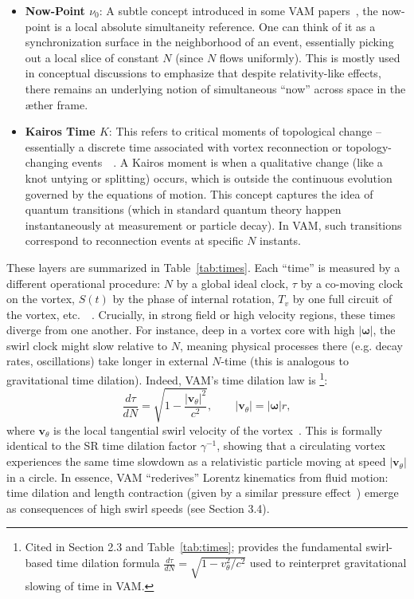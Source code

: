 \documentclass[a4paper,12pt]{article}
\begin{document}
\begin{itemize}
        \item \textbf{Now-Point $\nu_0$}: A subtle concept introduced in some VAM papers~\cite{reference_48}, the now-point is a local absolute simultaneity reference. One can think of it as a synchronization surface in the neighborhood of an event, essentially picking out a local slice of constant $N$ (since $N$ flows uniformly). This is mostly used in conceptual discussions to emphasize that despite relativity-like effects, there remains an underlying notion of simultaneous “now” across space in the æther frame.
        \item \textbf{Kairos Time $K$}: This refers to critical moments of topological change -- essentially a discrete time associated with vortex reconnection or topology-changing events~\cite{reference_49}~\cite{reference_50}. A Kairos moment is when a qualitative change (like a knot untying or splitting) occurs, which is outside the continuous evolution governed by the equations of motion. This concept captures the idea of quantum transitions (which in standard quantum theory happen instantaneously at measurement or particle decay). In VAM, such transitions correspond to reconnection events at specific $N$ instants.
    \end{itemize}

    These layers are summarized in Table~\ref{tab:times}. Each “time” is measured by a different operational procedure: $N$ by a global ideal clock, $\tau$ by a co-moving clock on the vortex, $S(t)$ by the phase of internal rotation, $T_v$ by one full circuit of the vortex, etc.~\cite{reference_51}~\cite{reference_52}. Crucially, in strong field or high velocity regions, these times diverge from one another. For instance, deep in a vortex core with high $|\boldsymbol{\omega}|$, the swirl clock might slow relative to $N$, meaning physical processes there (e.g. decay rates, oscillations) take longer in external $N$-time (this is analogous to gravitational time dilation). Indeed, VAM’s time dilation law is \cite{VAM4}\footnote{Cited in Section 2.3 and Table~\ref{tab:times}; provides the fundamental swirl-based time dilation formula $\frac{d\tau}{dN} = \sqrt{1 - v_\theta^2/c^2}$ used to reinterpret gravitational slowing of time in VAM.}:
    \begin{equation}
        \frac{d\tau}{dN} = \sqrt{1 - \frac{|\mathbf{v}_\theta|^2}{c^2}},
        \qquad |\mathbf{v}_\theta| = |\boldsymbol{\omega}|r,
        \label{eq:time-dilation}
    \end{equation}
    where $\mathbf{v}_\theta$ is the local tangential swirl velocity of the vortex~\cite{reference_53}. This is formally identical to the SR time dilation factor $\gamma^{-1}$, showing that a circulating vortex experiences the same time slowdown as a relativistic particle moving at speed $|\mathbf{v}_\theta|$ in a circle. In essence, VAM “rederives” Lorentz kinematics from fluid motion: time dilation and length contraction (given by a similar pressure effect~\cite{reference_54}) emerge as consequences of high swirl speeds (see Section 3.4).
\end{document}
